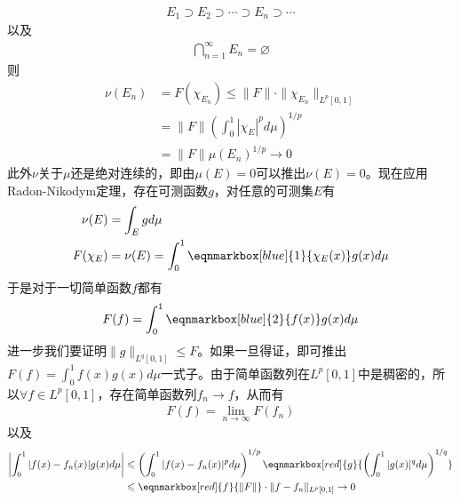 \begin{enumerate}[leftmargin=2cm, label=\arabic*]
\begin{enumerate}[leftmargin=1cm, label=(\arabic*)]
        \begin{align*}
            E_1\supset E_2\supset \cdots \supset E_n \supset \cdots
        \end{align*}
        以及
        \begin{align*}
            \bigcap\limits_{n=1}^{\infty} E_n = \varnothing
        \end{align*}
        则
        \begin{align*}
            \nu(E_n) &= F(\chi_{E_n}) \leqslant \|F\| \cdot \|\chi_{E_n}\|_{L^p[0,1]} \\
            &= \|F\| \left(\int_0^1 |\chi_E|^p d\mu \right)^{1/p} \\
            & = \|F\| \mu(E_n)^{1/p} \to 0
        \end{align*}    
        此外$\nu$关于$\mu$还是绝对连续的，即由$\mu(E)=0$可以推出$\nu(E)=0$。现在应用Radon-Nikodym定理，存在可测函数$g$，对任意的可测集$E$有
        \begin{align*}
            \nu(E) &= \int_E gd\mu \\
            F(\chi_E) &= \nu(E) = \int_0^1 \eqnmarkbox[blue]{1}{\chi_E(x)}g(x)d\mu
        \end{align*}
        于是对于一切简单函数$f$都有
        \begin{align*}
            F(f) = \int_0^1 \eqnmarkbox[blue]{2}{f(x)}g(x)d\mu
        \end{align*}
        进一步我们要证明$\|g\|_{L^q[0,1]}\leqslant F$。如果一旦得证，即可推出$F(f)=\int_0^1f(x)g(x)d\mu$一式子。由于简单函数列在$L^p[0,1]$中是稠密的，所以$\forall f\in L^p[0,1]$，存在简单函数列$f_n\to f$，从而有
        \begin{align*}
            F(f) = \lim\limits_{n\to\infty} F(f_n)
        \end{align*}
        以及
        \begin{align*}
            \left|\int_0^1|f(x) - f_n(x)|g(x)d\mu \right| &\leqslant \left(\int_0^1|f(x) - f_n(x)|^p d\mu \right)^{1/p} \eqnmarkbox[red]{g}{\left(\int_0^1 |g(x)|^q d\mu \right)^{1/q}} \\
            &\leqslant \eqnmarkbox[red]{f}{\|F\|} \cdot \|f-f_n\|_{L^p[0,1]} \to 0
        \end{align*}


\end{enumerate}
\end{enumerate}
